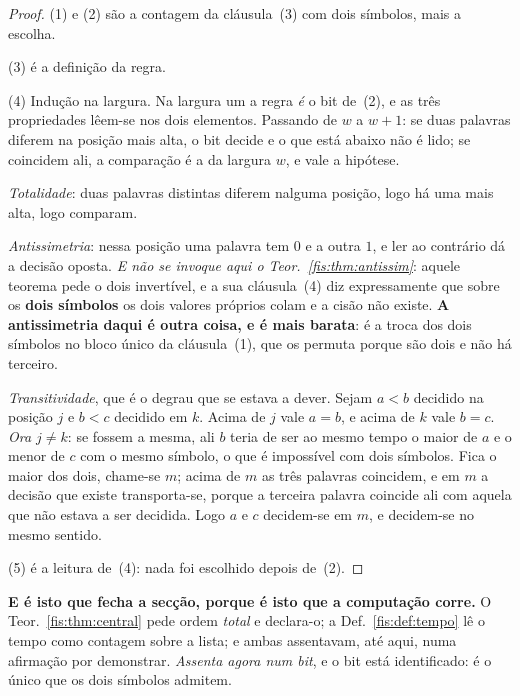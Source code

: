 \documentclass[livro.tex]{subfiles}
\begin{document}
\begin{proof}
(1) e (2) são a contagem da cláusula~(3) com dois símbolos, mais a escolha.

(3) é a definição da regra.

(4) Indução na largura. Na largura um a regra \emph{é} o bit de~(2), e as três
propriedades lêem-se nos dois elementos. Passando de $w$ a $w+1$: se duas
palavras diferem na posição mais alta, o bit decide e o que está abaixo não é
lido; se coincidem ali, a comparação é a da largura $w$, e vale a hipótese.

\emph{Totalidade}: duas palavras distintas diferem nalguma posição, logo há uma
mais alta, logo comparam.

\emph{Antissimetria}: nessa posição uma palavra tem $0$ e a outra $1$, e ler ao
contrário dá a decisão oposta. \emph{E não se invoque aqui o
Teor.~\ref{fis:thm:antissim}}: aquele teorema pede o dois invertível, e a sua
cláusula~(4) diz expressamente que sobre os \textbf{dois símbolos} os dois valores
próprios colam e a cisão não existe. \textbf{A antissimetria daqui é outra coisa,
e é mais barata}: é a troca dos dois símbolos no bloco único da cláusula~(1),
que os permuta porque são dois e não há terceiro.

\emph{Transitividade}, que é o degrau que se estava a dever. Sejam $a<b$
decidido na posição $j$ e $b<c$ decidido em $k$. Acima de $j$ vale $a=b$, e acima
de $k$ vale $b=c$. \emph{Ora $j\neq k$}: se fossem a mesma, ali $b$ teria de ser
ao mesmo tempo o maior de $a$ e o menor de $c$ com o mesmo símbolo, o que é
impossível com dois símbolos. Fica o maior dos dois, chame-se $m$; acima de $m$
as três palavras coincidem, e em $m$ a decisão que existe transporta-se, porque a
terceira palavra coincide ali com aquela que não estava a ser decidida. Logo $a$
e $c$ decidem-se em $m$, e decidem-se no mesmo sentido.

(5) é a leitura de~(4): nada foi escolhido depois de~(2).
\end{proof}


\medskip\noindent\textbf{E é isto que fecha a secção, porque é isto que a
computação corre.} O Teor.~\ref{fis:thm:central} pede ordem \emph{total} e
declara-o; a Def.~\ref{fis:def:tempo} lê o tempo como contagem sobre a lista; e
ambas assentavam, até aqui, numa afirmação por demonstrar. \emph{Assenta agora
num bit}, e o bit está identificado: é o único que os dois símbolos admitem.
\end{document}
